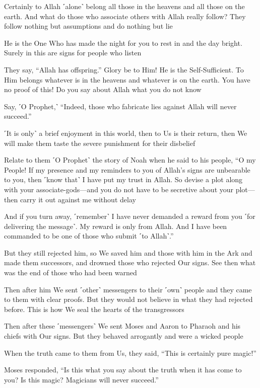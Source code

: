 Certainly to Allah ˹alone˺ belong all those in the heavens and all those on the earth. And what do those who associate others with Allah really follow? They follow nothing but assumptions and do nothing but lie

He is the One Who has made the night for you to rest in and the day bright. Surely in this are signs for people who listen

They say, “Allah has offspring.” Glory be to Him! He is the Self-Sufficient. To Him belongs whatever is in the heavens and whatever is on the earth. You have no proof of this! Do you say about Allah what you do not know

Say, ˹O Prophet,˺ “Indeed, those who fabricate lies against Allah will never succeed.”

˹It is only˺ a brief enjoyment in this world, then to Us is their return, then We will make them taste the severe punishment for their disbelief

Relate to them ˹O Prophet˺ the story of Noah when he said to his people, “O my People! If my presence and my reminders to you of Allah’s signs are unbearable to you, then ˹know that˺ I have put my trust in Allah. So devise a plot along with your associate-gods—and you do not have to be secretive about your plot—then carry it out against me without delay

And if you turn away, ˹remember˺ I have never demanded a reward from you ˹for delivering the message˺. My reward is only from Allah. And I have been commanded to be one of those who submit ˹to Allah˺.”

But they still rejected him, so We saved him and those with him in the Ark and made them successors, and drowned those who rejected Our signs. See then what was the end of those who had been warned

Then after him We sent ˹other˺ messengers to their ˹own˺ people and they came to them with clear proofs. But they would not believe in what they had rejected before. This is how We seal the hearts of the transgressors

Then after these ˹messengers˺ We sent Moses and Aaron to Pharaoh and his chiefs with Our signs. But they behaved arrogantly and were a wicked people

When the truth came to them from Us, they said, “This is certainly pure magic!”

Moses responded, “Is this what you say about the truth when it has come to you? Is this magic? Magicians will never succeed.”

